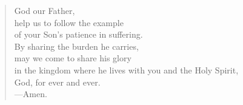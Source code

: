 \prayer

\setlength{\leftmargini}{\prayerleftmargini}

\begin{verse}
God our Father,\\
help us to follow the example\\
of your Son’s patience in suffering.\\
By sharing the burden he carries,\\
may we come to share his glory\\
in the kingdom where he lives with you and the Holy Spirit,\\
God, for ever and ever.\\
{\color{red}---\thinspace}Amen.
\end{verse}

\setlength{\leftmargini}{\defleftmargini}